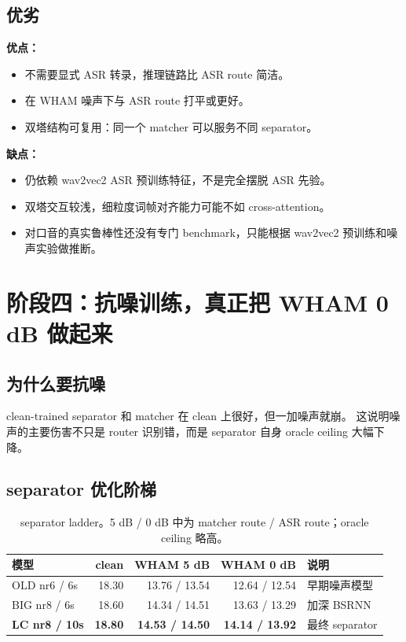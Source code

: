 \documentclass[UTF8,zihao=-4]{ctexart}
\begin{document}
\subsection{优劣}

\textbf{优点：}
\begin{itemize}
  \item 不需要显式 ASR 转录，推理链路比 ASR route 简洁。
  \item 在 WHAM 噪声下与 ASR route 打平或更好。
  \item 双塔结构可复用：同一个 matcher 可以服务不同 separator。
\end{itemize}

\textbf{缺点：}
\begin{itemize}
  \item 仍依赖 wav2vec2 ASR 预训练特征，不是完全摆脱 ASR 先验。
  \item 双塔交互较浅，细粒度词帧对齐能力可能不如 cross-attention。
  \item 对口音的真实鲁棒性还没有专门 benchmark，只能根据 wav2vec2 预训练和噪声实验做推断。
\end{itemize}

\section{阶段四：抗噪训练，真正把 WHAM 0 dB 做起来}

\subsection{为什么要抗噪}

clean-trained separator 和 matcher 在 clean 上很好，但一加噪声就崩。
这说明噪声的主要伤害不只是 router 识别错，而是 separator 自身 oracle ceiling 大幅下降。

\subsection{separator 优化阶梯}

\begin{table}[h]
\centering
\begin{tabularx}{\linewidth}{lrrrX}
\toprule
模型 & clean & WHAM 5 dB & WHAM 0 dB & 说明 \\
\midrule
OLD nr6 / 6s & 18.30 & 13.76 / 13.54 & 12.64 / 12.54 & 早期噪声模型 \\
BIG nr8 / 6s & 18.60 & 14.34 / 14.51 & 13.63 / 13.29 & 加深 BSRNN \\
\textbf{LC nr8 / 10s} & \textbf{18.80} & \textbf{14.53 / 14.50} & \textbf{14.14 / 13.92} & 最终 separator \\
\bottomrule
\end{tabularx}
\caption{separator ladder。5 dB / 0 dB 中为 matcher route / ASR route；oracle ceiling 略高。}
\end{table}
\end{document}
